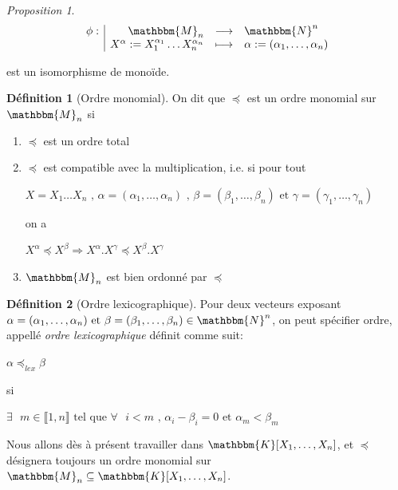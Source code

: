 \documentclass[12pt]{article}
\newcommand{\fonction}[5]{
\begin{displaymath}
\begin{array}{l|rcl}
\displaystyle
#1 : & #2 & \longrightarrow & #3 \\
    & #4 & \longmapsto & #5
\end{array}
\end{displaymath}
}
\theoremstyle{remark}\newtheorem{note}{Note}
\theoremstyle{remark}\newtheorem{nota}{Notation}
\newcommand{\M}{\mathbbm{M}}
\newcommand{\N}{\mathbbm{N}}
\newcommand{\K}{\mathbbm{K}}
\newcommand{\ord}{\preccurlyeq}
\newtheorem{prop}{Proposition}
\theoremstyle{definition}
\newtheorem{definition}{Définition}
\begin{document}
\begin{prop}
\fonction{\phi}{\M_n}{\N^n}{ X^{\alpha} := X_1^{\alpha_1}\ldots X_n^{\alpha_n}}{\alpha:=(\alpha_1,\ldots, \alpha_n)}
est un isomorphisme de monoïde.
\end{prop}

\begin{definition}[Ordre monomial]
On dit que $\ord$ est un ordre monomial sur $\M_n$ si 
	\begin{enumerate}
		\item $\ord$ est un ordre total
		\item $\ord$ est compatible avec la multiplication, i.e. si pour tout
		\begin{center} $X=X_1\ldots X_n  \text{ , } \alpha=(\alpha_1,\ldots, \alpha_n) \text{ , } \beta=(\beta_1,\ldots, \beta_n) \text{ et } \gamma=(\gamma_1,\ldots, \gamma_n)$\end{center}
on a 
		\begin{center}$X^{\alpha} \ord X^{\beta }\Rightarrow X^{\alpha}.X^{\gamma} \ord X^{\beta}.X^{\gamma}$\end{center}
		\item $\M_n$ est bien ordonné par $\ord$
	\end{enumerate}
\end{definition}

\begin{definition}[Ordre lexicographique]
Pour deux vecteurs exposant $\alpha=(\alpha_1,\ldots, \alpha_n) \text{ et } \beta=(\beta_1,\ldots, \beta_n) \in\N^n$, on peut spécifier ordre, appellé \textit{ordre lexicographique} définit comme suit:
	\begin{center} $\alpha\ord_{lex} \beta $\end{center}
	\begin{center} si \end{center}
	\begin{center} $\exists \text{ } m\in\llbracket 1,n \rrbracket \text{ tel que } \forall \text{ } i<m \text{ , } \alpha_i-\beta_i=0  \text{ et } \alpha_m < \beta_m$ \end{center}
\end{definition}

Nous allons dès à présent travailler dans $\K[X_1, \ldots, X_n]$, et $\ord$ désignera toujours un ordre monomial sur $\M_n\subseteq \K[X_1, \ldots, X_n]$.
\end{document}
